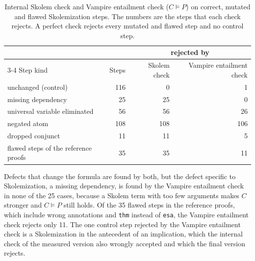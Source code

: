 \begin{table}[!htb]
\centering
\small
\caption{Internal Skolem check and Vampire entailment check ($C \models P$) on correct, mutated and flawed Skolemization steps. The numbers are the steps that each check rejects. A perfect check rejects every mutated and flawed step and no control step.}
\label{tab:disc-transfer-b}
\begin{tabular}{@{}l r r r@{}}
\toprule
 & & \multicolumn{2}{c}{rejected by} \\
\cmidrule(l){3-4}
Step kind & Steps & Skolem check & Vampire entailment check \\
\midrule
unchanged (control) & 116 & 0 & 1 \\
missing dependency & 25 & 25 & 0 \\
universal variable eliminated & 56 & 56 & 26 \\
negated atom & 108 & 108 & 106 \\
dropped conjunct & 11 & 11 & 5 \\
flawed steps of the reference proofs & 35 & 35 & 11 \\
\bottomrule
\end{tabular}
\end{table}

Defects that change the formula are found by both, but the defect specific to Skolemization, a missing dependency, is found by the Vampire entailment check in none of the 25 cases, because a Skolem term with too few arguments makes $C$ stronger and $C \models P$ still holds.
Of the 35 flawed steps in the reference proofs, which include wrong annotations and \texttt{thm} instead of \texttt{esa}, the Vampire entailment check rejects only 11.
The one control step rejected by the Vampire entailment check is a Skolemization in the antecedent of an implication, which the internal check of the measured version also wrongly accepted and which the final version rejects.

